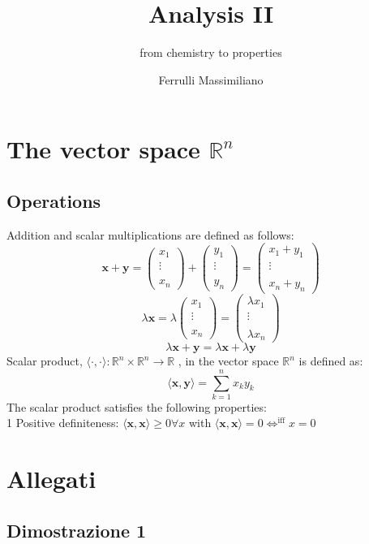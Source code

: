 \documentclass[a4paper,11pt]{article}
\newcommand{\icol}[1]{%
  \left(\begin{smallmatrix}#1\end{smallmatrix}\right)%
}
\renewcommand{\iff}{
  \Longleftrightarrow^{\text{iff}}
}
\begin{document}
\title{Analysis II}
\subtitle{from chemistry to properties}
\author{Ferrulli Massimiliano}  

\maketitle





\tableofcontents





\pagebreak



\section{The vector space $\mathbb{R}^n$}
\subsection{Operations}
Addition and scalar multiplications are defined as follows:
$$\mathbf{x+y} = \icol{x_1\\\vdots\\ \\ x_n} + \icol{y_1 \\ \vdots \\ \\ y_n } = \icol{x_1 + y_1 \\ \vdots \\ \\ x_n + y_n} $$
$$ \lambda \mathbf{x} = \lambda \icol{x_1 \\ \vdots \\ \\ x_n} = \icol{\lambda x_1 \\ \vdots \\ \\ \lambda x_n} $$
$$ \lambda \mathbf{x+y} = \lambda \mathbf{x} + \lambda \mathbf{y} $$
Scalar product, $ \langle \cdot , \cdot \rangle : \mathbb{R}^n \times \mathbb{R}^n \to \mathbb{R}$ , in the vector space $\mathbb{R}^n$ is defined as:
$$\langle \mathbf{x,y} \rangle = \sum_{k = 1}^{n} x_k y_k $$
The scalar product satisfies the following properties: \\
1 Positive definiteness: $\langle \mathbf{x,x} \rangle \geq 0  \forall x $ with  $ \langle \mathbf{x,x} \rangle = 0  \iff  x = 0 $









\pagebreak



\section{Allegati}
\label{sec:allegati}
\subsection{Dimostrazione 1}
\label{sec:Dimostrazione 1}
\end{document}
